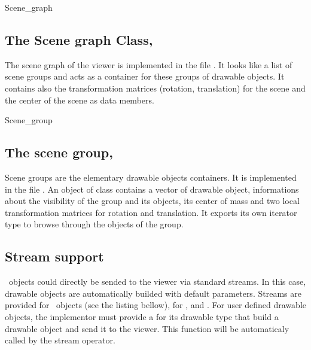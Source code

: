 \begin{ccClass}{Scene_graph}
\subsection{The Scene graph Class, \protect \ccClassTemplateName}

The scene graph of the viewer is implemented in the file
. It looks like a list of scene groups and acts as a
container for these groups of drawable objects. It contains also the
transformation matrices (rotation, translation) for the scene and the
center of the scene as data members.


\end{ccClass}
\begin{ccClass}{Scene_group}
\subsection{The scene group, \protect \ccClassTemplateName}

Scene groups are the elementary drawable objects containers. It is
implemented in the file . An object of class
 contains a vector of drawable object, informations about the
visibility of the group and its objects, its center of mass and two
local transformation matrices for rotation and translation. It exports 
its own iterator type to browse through the objects of the group.


\end{ccClass}

\subsection{Stream support}

\cgal\ objects could directly be sended to the viewer via standard
streams. In this case, drawable objects are automatically builded with 
default parameters. Streams are provided for \cgal\ objects (see the
listing bellow), for ,  and . For
user defined drawable objects, the implementor must provide a
 for its drawable type that build a drawable object
and send it to the viewer. This function will be automaticaly called
by the stream operator. 


